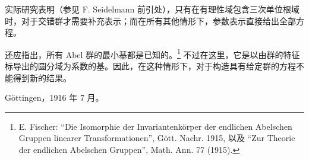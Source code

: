 实际研究表明（参见 F. Seidelmann 前引处），只有在有理性域包含三次单位根域时，对于交错群才需要补充表示；而在所有其他情形下，参数表示直接给出全部方程。

还应指出，所有 Abel 群的最小基都是已知的。\footnote{E. Fischer: “Die Isomorphie der Invariantenkörper der endlichen Abelschen Gruppen linearer Transformationen”, Gött. Nachr. 1915, 以及 “Zur Theorie der endlichen Abelschen Gruppen”, Math. Ann. 77 (1915).} 不过在这里，它是以由群的特征标导出的圆分域为系数的基。因此，在这种情形下，对于构造具有给定群的方程不能得到新的结果。

\medskip
\noindent Göttingen，1916 年 7 月。
